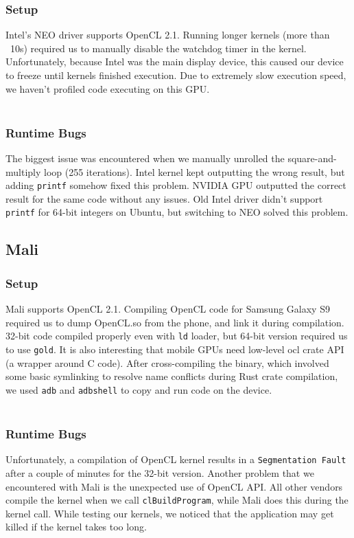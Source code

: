 \subsubsection{Setup}
Intel's NEO driver supports OpenCL 2.1. Running longer kernels (more than ~10s) required us to manually disable the watchdog timer in the kernel. Unfortunately, because Intel was the main display device, this caused our device to freeze until kernels finished execution. Due to extremely slow execution speed, we haven't profiled code executing on this GPU.\\\\
\subsubsection{Runtime Bugs}
The biggest issue was encountered when we manually unrolled the square-and-multiply loop (255 iterations). Intel kernel kept outputting the wrong result, but adding \texttt{printf} somehow fixed this problem. NVIDIA GPU outputted the correct result for the same code without any issues. Old Intel driver didn't support \texttt{printf} for 64-bit integers on Ubuntu, but switching to NEO solved this problem. 

\subsection{Mali}
\subsubsection{Setup}
Mali supports OpenCL 2.1. Compiling OpenCL code for Samsung Galaxy S9 required us to dump OpenCL.so from the phone, and link it during compilation. 32-bit code compiled properly even with \texttt{ld} loader, but 64-bit version required us to use \texttt{gold}. It is also interesting that mobile GPUs need low-level ocl crate API (a wrapper around C code). After cross-compiling the binary, which involved some basic symlinking to resolve name conflicts during Rust crate compilation, we used \texttt{adb} and \texttt{adbshell} to copy and run code on the device.\\\\
\subsubsection{Runtime Bugs}
Unfortunately, a compilation of OpenCL kernel results in a \texttt{Segmentation Fault} after a couple of minutes for the 32-bit version. Another problem that we encountered with Mali is the unexpected use of OpenCL API. All other vendors compile the kernel when we call \texttt{clBuildProgram}, while Mali does this during the kernel call. While testing our kernels, we noticed that the application may get killed if the kernel takes too long.

